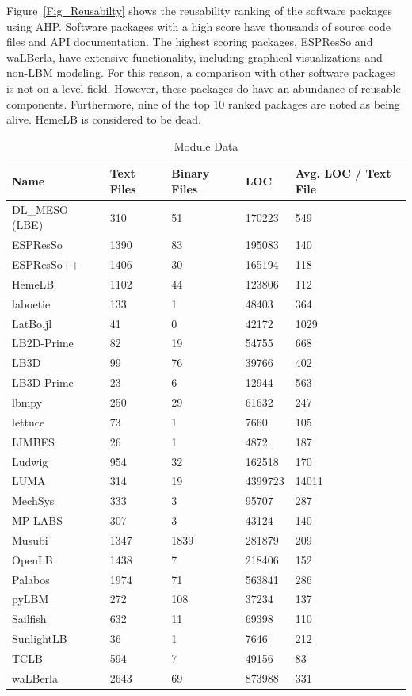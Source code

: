 \documentclass[final, 3p, times, authoryear]{elsarticle}
\begin{document}
Figure~\ref{Fig_Reusabilty} shows the reusability ranking of the software
packages using AHP. Software packages with a high score have thousands of source
code files and API documentation. The highest scoring packages, ESPResSo and
waLBerla, have extensive functionality, including graphical visualizations and
non-LBM modeling. For this reason, a comparison with other software packages is
not on a level field. However, these packages do have an abundance of reusable
components. Furthermore, nine of the top 10 ranked packages are noted as being
alive. HemeLB is considered to be dead.

\begin{table}
	\begin{center}
		\begin{tabular}{ p{3.5cm}p{2cm}p{2.5cm}p{2cm}p{2.5cm} }
			\toprule
			Name & Text Files & Binary Files & LOC & Avg. LOC / Text File\\
			\midrule
			DL\_MESO (LBE) & 310 & 51 & 170223 & 549\\
			ESPResSo & 1390& 83 & 195083 & 140\\
			ESPResSo++ & 1406& 30 & 165194 & 118\\
			HemeLB & 1102& 44 & 123806 & 112\\
			laboetie & 133& 1 & 48403 & 364\\		
			LatBo.jl & 41& 0 & 42172 & 1029\\
			LB2D-Prime & 82& 19 & 54755 & 668\\
			LB3D & 99 & 76 & 39766 & 402\\
			LB3D-Prime & 23& 6 & 12944 & 563\\
			lbmpy& 250 & 29 & 61632 & 247\\
			lettuce & 73 & 1 & 7660 & 105\\
			LIMBES & 26 & 1 & 4872 & 187\\
			Ludwig & 954 & 32 & 162518 & 170\\
			LUMA & 314 & 19 & 4399723 & 14011\\
			MechSys & 333 & 3 & 95707 & 287\\
			MP-LABS & 307 & 3 & 43124 & 140\\
			Musubi & 1347 & 1839 & 281879 & 209\\
			OpenLB & 1438 & 7 & 218406 & 152\\
			Palabos & 1974 & 71 & 563841 & 286\\
			pyLBM & 272 & 108 & 37234 & 137\\
			Sailfish & 632 & 11 & 69398 & 110\\
			SunlightLB & 36 & 1 & 7646 & 212\\
			TCLB & 594 & 7 & 49156 & 83\\
			waLBerla & 2643 & 69 & 873988 & 331\\
			\bottomrule
		\end{tabular}
		\caption{Module Data} \label{moduledata}
	\end{center}
\end{table}
\end{document}
